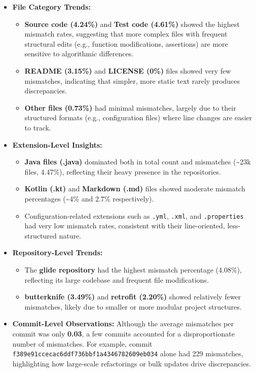 \documentclass[12pt, a4paper]{report}
\begin{document}
\begin{itemize}
    \item \textbf{File Category Trends:}  
    \begin{itemize}
        \item \textbf{Source code (4.24\%)} and \textbf{Test code (4.61\%)} showed the highest mismatch rates, suggesting that more complex files with frequent structural edits (e.g., function modifications, assertions) are more sensitive to algorithmic differences.  
        \item \textbf{README (3.15\%)} and \textbf{LICENSE (0\%)} files showed very few mismatches, indicating that simpler, more static text rarely produces discrepancies.  
        \item \textbf{Other files (0.73\%)} had minimal mismatches, largely due to their structured formats (e.g., configuration files) where line changes are easier to track.  
    \end{itemize}

    \item \textbf{Extension-Level Insights:}  
    \begin{itemize}
        \item \textbf{Java files (.java)} dominated both in total count and mismatches (\textasciitilde 23k files, 4.47\%), reflecting their heavy presence in the repositories.  
        \item \textbf{Kotlin (.kt)} and \textbf{Markdown (.md)} files showed moderate mismatch percentages (\textasciitilde 4\% and 2.7\% respectively).  
        \item Configuration-related extensions such as \texttt{.yml}, \texttt{.xml}, and \texttt{.properties} had very low mismatch rates, consistent with their line-oriented, less-structured nature.  
    \end{itemize}

    \item \textbf{Repository-Level Trends:}  
    \begin{itemize}
        \item The \textbf{glide repository} had the highest mismatch percentage (4.08\%), reflecting its large codebase and frequent file modifications.  
        \item \textbf{butterknife (3.49\%)} and \textbf{retrofit (2.20\%)} showed relatively fewer mismatches, likely due to smaller or more modular project structures.  
    \end{itemize}

    \item \textbf{Commit-Level Observations:}  
    Although the average mismatches per commit was only \textbf{0.03}, a few commits accounted for a disproportionate number of mismatches. For example, commit \texttt{f389e91ccecac6ddf736bbf1a4346782609eb034} alone had 229 mismatches, highlighting how large-scale refactorings or bulk updates drive discrepancies.
\end{itemize}
\end{document}

